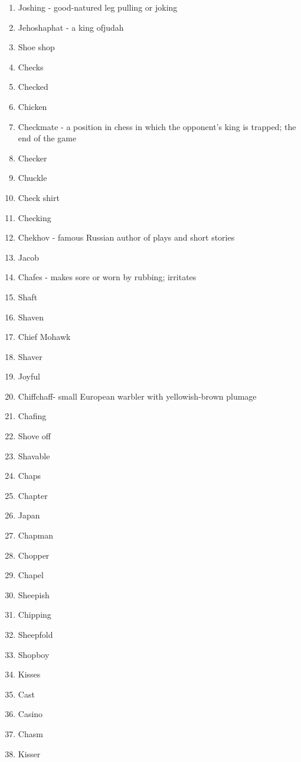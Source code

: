 \begin{enumerate}
        \item Joshing - good-natured leg pulling or joking
        \item Jehoshaphat - a king ofjudah
        \item Shoe shop
        \item Checks
        \item Checked
        \item Chicken
        \item Checkmate - a position in chess in which the opponent's king is trapped; the end of the game
        \item Checker
        \item Chuckle
        \item Check shirt
        \item Checking
        \item Chekhov - famous Russian author of plays and short stories
        \item Jacob
        \item Chafes - makes sore or worn by rubbing; irritates
        \item Shaft
        \item Shaven
        \item Chief Mohawk
        \item Shaver
        \item Joyful
        \item Chiffchaff- small European warbler with yellowish-brown plumage
        \item Chafing
        \item Shove off
        \item Shavable
        \item Chaps
        \item Chapter
        \item Japan
        \item Chapman
        \item Chopper
        \item Chapel
        \item Sheepish
        \item Chipping
        \item Sheepfold
        \item Shopboy
        \item Kisses
        \item Cast
        \item Casino
        \item Chasm
        \item Kisser

\end{enumerate}
